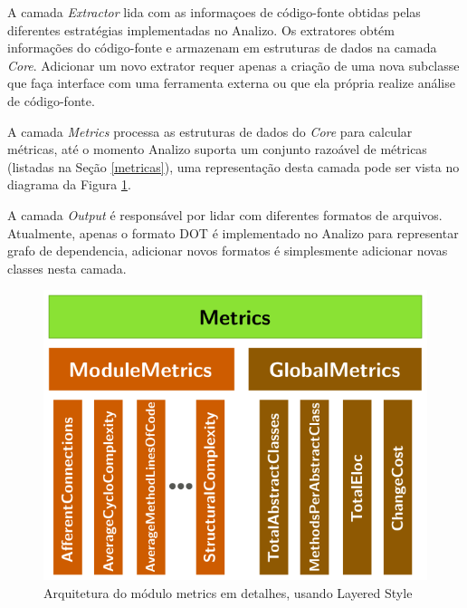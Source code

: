 A camada {\it Extractor} lida com as informaçoes de código-fonte obtidas pelas
diferentes estratégias implementadas no Analizo. Os extratores obtém
informações do código-fonte e armazenam em estruturas de dados na camada {\it
Core}. Adicionar um novo extrator requer apenas a criação de uma nova subclasse
que faça interface com uma ferramenta externa ou que ela própria realize análise
de código-fonte.


A camada {\it Metrics} processa as estruturas de dados do {\it Core} para
calcular métricas, até o momento Analizo suporta um conjunto razoável de
métricas (listadas na Seção \ref{metricas}), uma representação desta camada
pode ser vista no diagrama da Figura \ref{arquitetura-metrics-analizo}.

A camada {\it Output} é responsável por lidar com diferentes formatos de
arquivos.  Atualmente, apenas o formato DOT é implementado no Analizo para
representar grafo de dependencia, adicionar novos formatos é simplesmente
adicionar novas classes nesta camada.

\begin{figure}[h]
\center
\includegraphics[scale=0.4]{imagens/analizo-metrics-architecture.png}
\caption{Arquitetura do módulo metrics em detalhes, usando Layered Style \cite{Clements2002}}
\label{arquitetura-metrics-analizo}
\end{figure}

